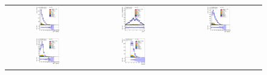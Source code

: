 

\begin{figure}[h!]
\begin{center}
\begin{tabular}{ccc}
%
\includegraphics[width=0.30\textwidth]{appendices/figures/sdrs/LepPt_ELEMUONCR0_1W_NOMINAL.eps} &
\includegraphics[width=0.30\textwidth]{appendices/figures/sdrs/LepEta_ELEMUONCR0_1W_NOMINAL.eps} &
\includegraphics[width=0.30\textwidth]{appendices/figures/sdrs/MET_ELEMUONCR0_1W_NOMINAL.eps} \\
\includegraphics[width=0.30\textwidth]{appendices/figures/sdrs/Wlep_MassT_ELEMUONCR0_1W_NOMINAL.eps} &
\includegraphics[width=0.30\textwidth]{appendices/figures/sdrs/Njets25_ELEMUONCR0_1W_NOMINAL.eps}  &

\end{tabular}
\end{center}
\end{figure}
